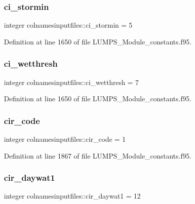 \subsubsection{\texorpdfstring{ci\+\_\+stormin}{ci\_stormin}}
{\footnotesize\ttfamily integer colnamesinputfiles\+::ci\+\_\+stormin = 5}



Definition at line 1650 of file L\+U\+M\+P\+S\+\_\+\+Module\+\_\+constants.\+f95.

\mbox{\label{namespacecolnamesinputfiles_af0008ac036ba147383062dec2ade17af}} 
\subsubsection{\texorpdfstring{ci\+\_\+wetthresh}{ci\_wetthresh}}
{\footnotesize\ttfamily integer colnamesinputfiles\+::ci\+\_\+wetthresh = 7}



Definition at line 1650 of file L\+U\+M\+P\+S\+\_\+\+Module\+\_\+constants.\+f95.

\mbox{\label{namespacecolnamesinputfiles_adea45bfc33129bf5236443899c32e784}} 
\subsubsection{\texorpdfstring{cir\+\_\+code}{cir\_code}}
{\footnotesize\ttfamily integer colnamesinputfiles\+::cir\+\_\+code = 1}



Definition at line 1867 of file L\+U\+M\+P\+S\+\_\+\+Module\+\_\+constants.\+f95.

\mbox{\label{namespacecolnamesinputfiles_ae366ea7f91d46d7ae02adbaa72c69fc7}} 
\subsubsection{\texorpdfstring{cir\+\_\+daywat1}{cir\_daywat1}}
{\footnotesize\ttfamily integer colnamesinputfiles\+::cir\+\_\+daywat1 = 12}



